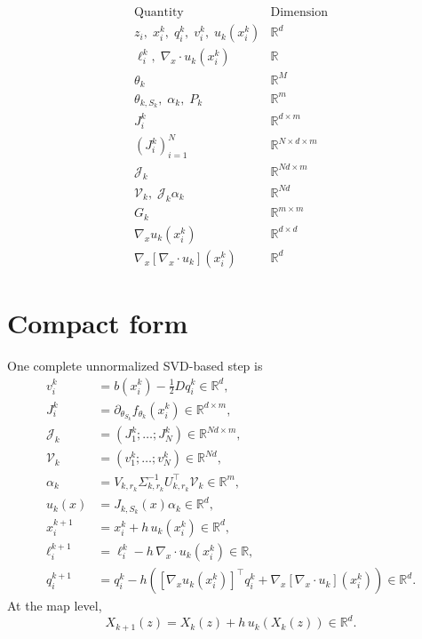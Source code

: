 \documentclass[11pt]{article}
\newcommand{\R}{\mathbb{R}}
\begin{document}
\[
\begin{array}{c|c}
\text{Quantity} & \text{Dimension}\\
\hline
z_i,\;x_i^k,\;q_i^k,\;v_i^k,\;u_k(x_i^k) & \R^d\\
\ell_i^k,\;\nabla_x\cdot u_k(x_i^k) & \R\\
\theta_k & \R^M\\
\theta_{k,S_k},\;\alpha_k,\;P_k & \R^m\\
J_i^k & \R^{d\times m}\\
(J_i^k)_{i=1}^N & \R^{N\times d\times m}\\
\mathcal J_k & \R^{Nd\times m}\\
\mathcal V_k,\;\mathcal J_k\alpha_k & \R^{Nd}\\
G_k & \R^{m\times m}\\
\nabla_xu_k(x_i^k) & \R^{d\times d}\\
\nabla_x[\nabla_x\cdot u_k](x_i^k) & \R^d
\end{array}
\]

\section{Compact form}

One complete unnormalized SVD-based step is
\[
\boxed{
\begin{aligned}
v_i^k
&=b(x_i^k)-\frac12Dq_i^k\in\R^d,\\
J_i^k
&=\partial_{\theta_{S_k}}f_{\theta_k}(x_i^k)\in\R^{d\times m},\\
\mathcal J_k
&=(J_1^k;\ldots;J_N^k)\in\R^{Nd\times m},\\
\mathcal V_k
&=(v_1^k;\ldots;v_N^k)\in\R^{Nd},\\
\alpha_k
&=V_{k,r_k}\Sigma_{k,r_k}^{-1}U_{k,r_k}^\top\mathcal V_k\in\R^m,\\
u_k(x)
&=J_{k,S_k}(x)\alpha_k\in\R^d,\\
x_i^{k+1}
&=x_i^k+h\,u_k(x_i^k)\in\R^d,\\
\ell_i^{k+1}
&=\ell_i^k-h\,\nabla_x\cdot u_k(x_i^k)\in\R,\\
q_i^{k+1}
&=q_i^k-h\left([\nabla_xu_k(x_i^k)]^\top q_i^k
+\nabla_x[\nabla_x\cdot u_k](x_i^k)\right)\in\R^d.
\end{aligned}
}
\]
At the map level,
\[
\boxed{
X_{k+1}(z)=X_k(z)+h\,u_k(X_k(z))\in\R^d.
}
\]
\end{document}
